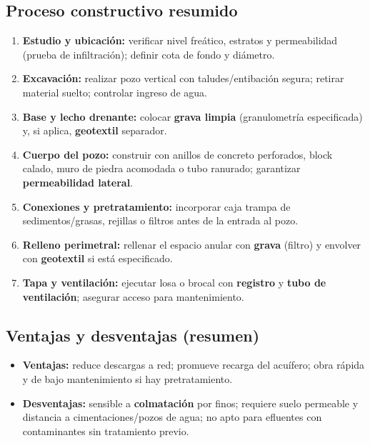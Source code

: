 \documentclass[12pt]{article}
\begin{document}
	\subsection*{Proceso constructivo resumido}
	\begin{enumerate}[leftmargin=*, itemsep=2pt]
		\item \textbf{Estudio y ubicación:} verificar nivel freático, estratos y permeabilidad (prueba de infiltración); definir cota de fondo y diámetro.
		\item \textbf{Excavación:} realizar pozo vertical con taludes/entibación segura; retirar material suelto; controlar ingreso de agua.
		\item \textbf{Base y lecho drenante:} colocar \textbf{grava limpia} (granulometría especificada) y, si aplica, \textbf{geotextil} separador.
		\item \textbf{Cuerpo del pozo:} construir con anillos de concreto perforados, block calado, muro de piedra acomodada o tubo ranurado; garantizar \textbf{permeabilidad lateral}.
		\item \textbf{Conexiones y pretratamiento:} incorporar caja trampa de sedimentos/grasas, rejillas o filtros antes de la entrada al pozo.
		\item \textbf{Relleno perimetral:} rellenar el espacio anular con \textbf{grava} (filtro) y envolver con \textbf{geotextil} si está especificado.
		\item \textbf{Tapa y ventilación:} ejecutar losa o brocal con \textbf{registro} y \textbf{tubo de ventilación}; asegurar acceso para mantenimiento.
	\end{enumerate}
	
	\subsection*{Ventajas y desventajas (resumen)}
	\begin{itemize}[leftmargin=*, itemsep=2pt]
		\item \textbf{Ventajas:} reduce descargas a red; promueve recarga del acuífero; obra rápida y de bajo mantenimiento si hay pretratamiento.
		\item \textbf{Desventajas:} sensible a \textbf{colmatación} por finos; requiere suelo permeable y distancia a cimentaciones/pozos de agua; no apto para efluentes con contaminantes sin tratamiento previo.
	\end{itemize}
	
\end{document}
